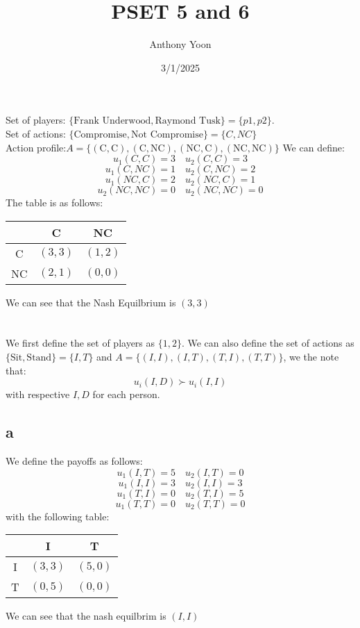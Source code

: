 \documentclass[11pt]{article}
\title{PSET 5 and 6}
\author{Anthony Yoon}
\date{3/1/2025}
\begin{document}
\maketitle
\section{}
Set of players: $\{ \text{Frank Underwood}, \text{Raymond Tusk}\} = \{p1, p2\}$.\\ 
Set of actions: $\{\text{Compromise}, \text{Not Compromise}\} = \{ C, NC\}$ \\
Action profile:$A = \{ (\text{C}, \text{C}),(\text{C}, \text{NC}), (\text{NC}, \text{C}), (\text{NC}, \text{NC})\}$
We can define:
\[
u_1(C, C) = 3 \quad u_2(C,C) = 3 
\]
\[
u_1(C, NC) = 1 \quad u_2(C, NC) = 2
\]
\[
u_1(NC, C) = 2 \quad u_2(NC, C) = 1
\]
\[
u_2(NC, NC) = 0 \quad u_2(NC, NC) = 0
\]
The table is as follows:
\begin{table}[H]
    \centering 
    \begin{tabular}{c|c|c}
        & C & NC\\
        \hline
        C & $(3,3)$ & $(1,2)$\\
        NC & $(2,1)$ & $(0,0)$ 
    \end{tabular}
\end{table}
\noindent We can see that the Nash Equilbrium is $(3,3)$
\newpage
\section{}
We first define the set of players as $\{1,2\}$. We can also define the set of actions as $\{ \text{Sit}, \text{Stand} \} =\{I, T\}$ and $A = \{ (I, I), (I, T), (T, I), (T,T)\}$, we the note that:
\[
u_i(I, D) \succ u_i(I, I)
\] 
with respective $I, D$ for each person. 
\subsection*{a}
We define the payoffs as follows:
\[
u_1(I, T) = 5 \quad u_2(I,T) = 0
\]
\[
u_1(I, I) = 3 \quad u_2(I, I) = 3
\]
\[
u_1(T, I) = 0 \quad u_2(T, I) = 5
\]
\[
u_1(T, T) = 0 \quad u_2(T,T) = 0
\]
with the following table:
\begin{table}[H]
    \centering 
    \begin{tabular}{c|c|c}
        & I & T\\
        \hline
        I & $(3,3)$ & $(5,0)$\\
        T & $(0,5)$ & $(0,0)$ 
    \end{tabular}
\end{table}
\noindent We can see that the nash equilbrim is $(I,I)$
\end{document}
